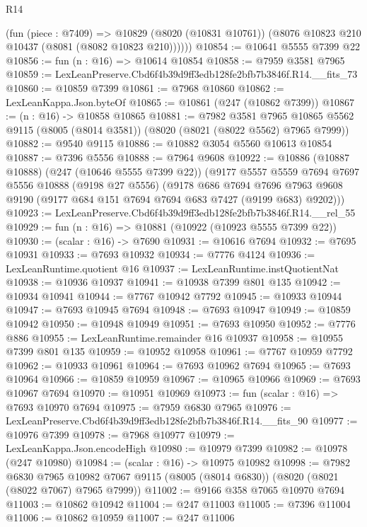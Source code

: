 \begin{lexlean}{R14}
\begin{coremodule}
        (fun (piece : @7409) =>
        @10829 (@8020 (@10831 @10761)) (@8076 @10823 @210 @10437 (@8081 (@8082 @10823 @210))))))
@10854 := @10641 @5555 @7399 @22
@10856 := fun (n : @16) => @10614 @10854
@10858 := @7959 @3581 @7965
@10859 := LexLeanPreserve.Cbd6f4b39d9ff3edb128fe2bfb7b3846f.R14.__fits_73
@10860 := @10859 @7399
@10861 := @7968 @10860
@10862 := LexLeanKappa.Json.byteOf
@10865 := @10861 (@247 (@10862 @7399))
@10867 := (n : @16) -> @10858 @10865
@10881 := @7982
    @3581
    @7965
    @10865
    @5562
    @9115
    (@8005 (@8014 @3581))
    (@8020 (@8021 (@8022 @5562) @7965 @7999))
@10882 := @9540 @9115
@10886 := @10882 @3054 @5560 @10613 @10854
@10887 := @7396 @5556
@10888 := @7964 @9608
@10922 := @10886
    (@10887 @10888)
    (@247 (@10646 @5555 @7399 @22))
    (@9177
      @5557
      @5559
      @7694
      @7697
      @5556
      @10888
      (@9198 @27 @5556)
      (@9178
        @686
        @7694
        @7696
        @7963
        @9608
        @9190
        (@9177 @684 @151 @7694 @7694 @683 @7427 (@9199 @683) @9202)))
@10923 := LexLeanPreserve.Cbd6f4b39d9ff3edb128fe2bfb7b3846f.R14.__rel_55
@10929 := fun (n : @16) => @10881 (@10922 (@10923 @5555 @7399 @22))
@10930 := (scalar : @16) -> @7690
@10931 := @10616 @7694
@10932 := @7695 @10931
@10933 := @7693 @10932
@10934 := @7776 @4124
@10936 := LexLeanRuntime.quotient @16
@10937 := LexLeanRuntime.instQuotientNat
@10938 := @10936 @10937
@10941 := @10938 @7399 @801 @135
@10942 := @10934 @10941
@10944 := @7767 @10942 @7792
@10945 := @10933 @10944
@10947 := @7693 @10945 @7694
@10948 := @7693 @10947
@10949 := @10859 @10942
@10950 := @10948 @10949
@10951 := @7693 @10950
@10952 := @7776 @886
@10955 := LexLeanRuntime.remainder @16 @10937
@10958 := @10955 @7399 @801 @135
@10959 := @10952 @10958
@10961 := @7767 @10959 @7792
@10962 := @10933 @10961
@10964 := @7693 @10962 @7694
@10965 := @7693 @10964
@10966 := @10859 @10959
@10967 := @10965 @10966
@10969 := @7693 @10967 @7694
@10970 := @10951 @10969
@10973 := fun (scalar : @16) => @7693 @10970 @7694
@10975 := @7959 @6830 @7965
@10976 := LexLeanPreserve.Cbd6f4b39d9ff3edb128fe2bfb7b3846f.R14.__fits_90
@10977 := @10976 @7399
@10978 := @7968 @10977
@10979 := LexLeanKappa.Json.encodeHigh
@10980 := @10979 @7399
@10982 := @10978 (@247 @10980)
@10984 := (scalar : @16) -> @10975 @10982
@10998 := @7982
    @6830
    @7965
    @10982
    @7067
    @9115
    (@8005 (@8014 @6830))
    (@8020 (@8021 (@8022 @7067) @7965 @7999))
@11002 := @9166 @358 @7065 @10970 @7694
@11003 := @10862 @10942
@11004 := @247 @11003
@11005 := @7396 @11004
@11006 := @10862 @10959
@11007 := @247 @11006

\end{coremodule}
\end{lexlean}
